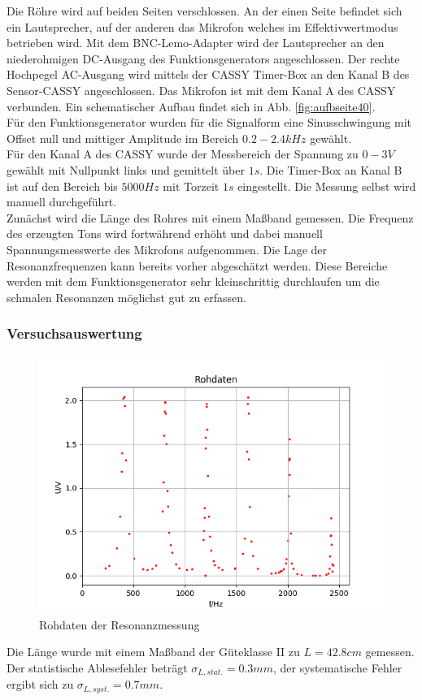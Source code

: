 \documentclass[12pt,a4paper]{article}
\begin{document}
Die Röhre wird auf beiden Seiten verschlossen. An der einen Seite befindet sich ein Lautsprecher, auf der anderen das Mikrofon welches im Effektivwertmodus betrieben wird.
Mit dem BNC-Lemo-Adapter wird der Lautsprecher an den niederohmigen DC-Ausgang des Funktionsgenerators angeschlossen. Der rechte Hochpegel AC-Ausgang wird mittels der CASSY Timer-Box an den Kanal B des Sensor-CASSY angeschlossen. Das Mikrofon ist mit dem Kanal A des CASSY verbunden. Ein schematischer Aufbau findet sich in Abb.  \ref{fig:aufbseite40}.\\
Für den Funktionsgenerator wurden für die Signalform eine Sinusschwingung mit Offset null und mittiger Amplitude im Bereich $0.2-2.4 kHz$ gewählt.\\

Für den Kanal A des CASSY wurde der Messbereich der Spannung zu $0-3V$ gewählt mit Nullpunkt links und gemittelt über $1s$.
Die Timer-Box an Kanal B ist auf den Bereich bis $5000Hz$ mit Torzeit $1s$ eingestellt. Die Messung selbst wird manuell durchgeführt.\\

Zunächst wird die Länge des Rohres mit einem Maßband gemessen.
Die Frequenz des erzeugten Tons wird fortwährend erhöht und dabei manuell Spannungsmesswerte des Mikrofons aufgenommen. Die Lage der Resonanzfrequenzen kann bereits vorher abgeschätzt werden. Diese Bereiche werden mit dem Funktionsgenerator sehr kleinschrittig durchlaufen um die schmalen Resonanzen möglichst gut zu erfassen.

\subsubsection{Versuchsauswertung}
\begin{figure}
	\includegraphics[width=\linewidth]{rohres}
	\caption{Rohdaten der Resonanzmessung}
	\label{fig:rohresonanz}
\end{figure}
Die Länge wurde mit einem Maßband der Güteklasse II zu $L=42.8cm$ gemessen. Der statistische Ablesefehler beträgt $\sigma_{L,stat.}=0.3mm$, der systematische Fehler ergibt sich zu $\sigma_{L,syst.}=0.7mm$.
\end{document}
